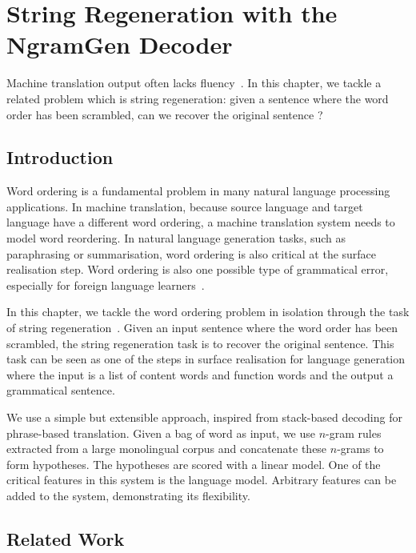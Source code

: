 \chapter{String Regeneration with the NgramGen Decoder}


Machine translation output often lacks
fluency~\citep{knight:2007:TALK}.
In this chapter, we tackle a related problem which
is string regeneration: given a sentence where the
word order has been scrambled, can we recover the
original sentence ?

\section{Introduction}

Word ordering is a fundamental problem in many natural language
processing applications. In machine translation, because
source language and target language have a different word
ordering, a machine translation system needs to model word
reordering. In natural language generation tasks, such
as paraphrasing or summarisation, word ordering
is also critical at the surface realisation step.
Word ordering is also one possible type of grammatical
error, especially for foreign language
learners~\citep{yu-chen:2012:COLING}.

In this chapter, we tackle the word ordering problem in
isolation through the task of
string regeneration~\citep{wan-dras-dale-paris:2009:EACL}.
Given an input sentence where the word order has
been scrambled, the string regeneration task is to recover
the original sentence. This task can be seen as one of the
steps in surface realisation for language generation where
the input is a list of content words and function words and
the output a grammatical sentence.

We use a simple but extensible approach, inspired from
stack-based decoding for phrase-based translation.
Given a bag of word as input, we use $n$-gram rules
extracted from a large monolingual corpus and concatenate
these $n$-grams to form hypotheses. The hypotheses are scored
with a linear model. One of the critical features in this system
is the language model. Arbitrary features can be added to the
system, demonstrating its flexibility.

\section{Related Work}

